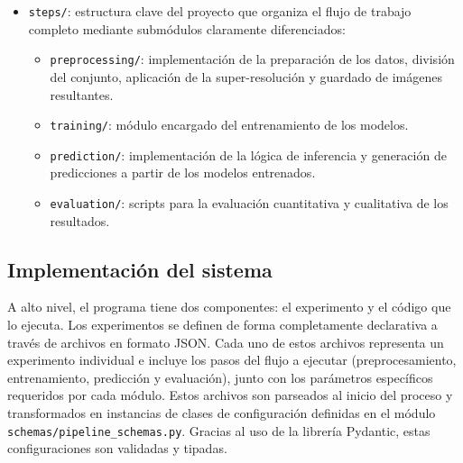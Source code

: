 \documentclass[../main.tex]{subfiles}
\begin{document}
\begin{itemize}
    \item \texttt{steps/}: estructura clave del proyecto que organiza el flujo de trabajo completo mediante submódulos claramente diferenciados:
    \begin{itemize}
        \item \texttt{preprocessing/}: implementación de la preparación de los datos, división del conjunto, aplicación de la super-resolución y guardado de imágenes resultantes.
        \item \texttt{training/}: módulo encargado del entrenamiento de los modelos.
        \item \texttt{prediction/}: implementación de la lógica de inferencia y generación de predicciones a partir de los modelos entrenados.
        \item \texttt{evaluation/}: scripts para la evaluación cuantitativa y cualitativa de los resultados.
    \end{itemize}
\end{itemize}

\subsection{Implementación del sistema}
A alto nivel, el programa tiene dos componentes: el experimento y el código que lo ejecuta. Los experimentos se definen de forma completamente declarativa a través de archivos en formato JSON. Cada uno de estos archivos representa un experimento individual e incluye los pasos del flujo a ejecutar (preprocesamiento, entrenamiento, predicción y evaluación), junto con los parámetros específicos requeridos por cada módulo. Estos archivos son parseados al inicio del proceso y transformados en instancias de clases de configuración definidas en el módulo \texttt{schemas/pipeline\_schemas.py}. Gracias al uso de la librería Pydantic, estas configuraciones son validadas y tipadas.
\end{document}
